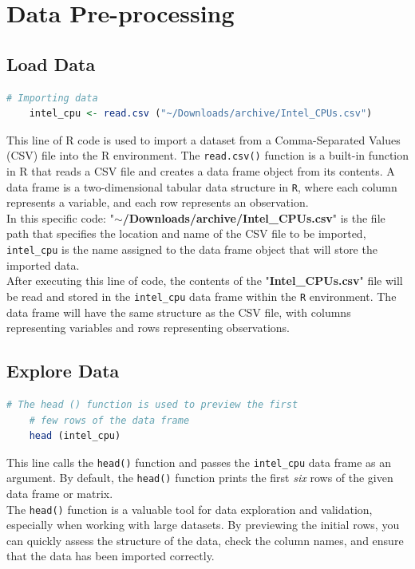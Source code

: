 \section{Data Pre-processing}
\subsection{Load Data}
\begin{lstlisting}[language=R]
    # Importing data 
    intel_cpu <- read.csv ("~/Downloads/archive/Intel_CPUs.csv")
\end{lstlisting}

This line of R code is used to import a dataset from a Comma-Separated Values (CSV) file into the R environment.
The \texttt{read.csv()} function is a built-in function in R that reads a CSV file and creates a data frame object from its contents. A data frame is a two-dimensional tabular data structure in \texttt{R}, where each column represents a variable, and each row represents an observation.\\

In this specific code:
"\textbf{$\sim$/Downloads/archive/Intel\_CPUs.csv}" is the file path that specifies the location and name of the CSV file to be imported, \texttt{intel\_cpu} is the name assigned to the data frame object that will store the imported data.\\

After executing this line of code, the contents of the "\textbf{Intel\_CPUs.csv}" file will be read and stored in the \texttt{intel\_cpu} data frame within the \texttt{R} environment. The data frame will have the same structure as the CSV file, with columns representing variables and rows representing observations.

\subsection{Explore Data}
\begin{lstlisting}[language=R]
    # The head () function is used to preview the first 
    # few rows of the data frame
    head (intel_cpu)
\end{lstlisting}

This line calls the \texttt{head()} function and passes the \texttt{intel\_cpu} data frame as an argument. By default, the \texttt{head()} function prints the first \textit{six} rows of the given data frame or matrix.\\

The \texttt{head()} function is a valuable tool for data exploration and validation, especially when working with large datasets. By previewing the initial rows, you can quickly assess the structure of the data, check the column names, and ensure that the data has been imported correctly.\\

